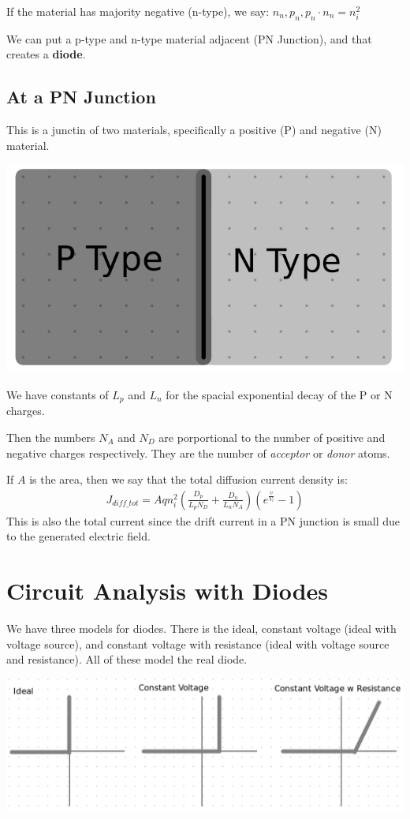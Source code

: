\documentclass[12pt,letterpaper]{article} \usepackage{amsmath} \usepackage{graphicx} \usepackage[margin=1in]{geometry} \usepackage{longtable}  \usepackage{amssymb}
\begin{document}
	If the material has majority negative (n-type), we say: $n_n, p_n, p_n\cdot n_n = n_i^2$
	
	We can put a p-type and n-type material adjacent (PN Junction), and that creates a \textbf{diode}.
	
	\subsection{At a PN Junction}
	This is a junctin of two materials, specifically a positive (P) and negative (N) material. 
	\begin{center}
		\includegraphics[width=0.23\linewidth]{pn-junction}
	\end{center}

	We have constants of $L_p$ and $L_n$ for the spacial exponential decay of the P or N charges. 
	
	Then the numbers $N_A$ and $N_D$ are porportional to the number of positive and negative charges respectively. They are the number of \textit{acceptor} or \textit{donor} atoms. 
	
	If $A$ is the area, then we say that the total diffusion current density is:
	\begin{align*}
		J_{diff\_tot} = Aqn_i^2\left(\frac{D_p}{L_pN_D}+\frac{D_n}{L_nN_A}\right)\left(e^{\frac{v}{V_t}}-1\right)
	\end{align*}
	This is also the total current since the drift current in a PN junction is small due to the generated electric field. 
	
	
	
	\section{Circuit Analysis with Diodes}
	We have three models for diodes. There is the ideal, constant voltage (ideal with voltage source), and constant voltage with resistance (ideal with voltage source and resistance). All of these model the real diode. 
	\begin{center}
		\includegraphics[width=0.8\linewidth]{diode-models}
	\end{center}
\end{document}

